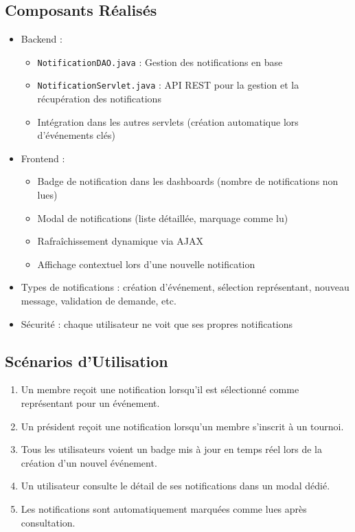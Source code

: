 \documentclass[12pt,a4paper]{article}
\begin{document}
\subsection{Composants Réalisés}
\begin{itemize}
    \item Backend :
    \begin{itemize}
        \item \texttt{NotificationDAO.java} : Gestion des notifications en base
        \item \texttt{NotificationServlet.java} : API REST pour la gestion et la récupération des notifications
        \item Intégration dans les autres servlets (création automatique lors d'événements clés)
    \end{itemize}
    \item Frontend :
    \begin{itemize}
        \item Badge de notification dans les dashboards (nombre de notifications non lues)
        \item Modal de notifications (liste détaillée, marquage comme lu)
        \item Rafraîchissement dynamique via AJAX
        \item Affichage contextuel lors d'une nouvelle notification
    \end{itemize}
    \item Types de notifications : création d'événement, sélection représentant, nouveau message, validation de demande, etc.
    \item Sécurité : chaque utilisateur ne voit que ses propres notifications
\end{itemize}

\subsection{Scénarios d'Utilisation}
\begin{enumerate}
    \item Un membre reçoit une notification lorsqu'il est sélectionné comme représentant pour un événement.
    \item Un président reçoit une notification lorsqu'un membre s'inscrit à un tournoi.
    \item Tous les utilisateurs voient un badge mis à jour en temps réel lors de la création d'un nouvel événement.
    \item Un utilisateur consulte le détail de ses notifications dans un modal dédié.
    \item Les notifications sont automatiquement marquées comme lues après consultation.
\end{enumerate}
\end{document}
